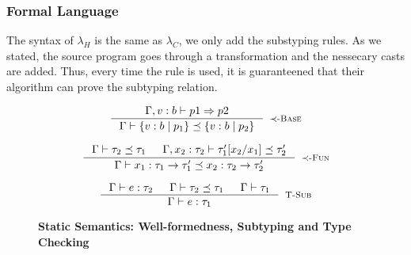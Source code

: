 \subsubsection{Formal Language}

The syntax of $\lambda_H$ is the same as $\lambda_C$, we only add the substyping rules.
As we stated, the source program goes through a transformation and the nessecary casts are added.
Thus, every time the \tsub rule is used, it is guaranteened that their algorithm can prove
the subtyping relation.

\begin{figure}[ht!]
\medskip {}

$$
\inference
   {\Gamma, v:b \vdash  p1 \Rightarrow p2 }
   {\isSubType{\Gamma}{\tref{b}{p_1}}{\tref{b}{p_2}}}
   [\tsubBase]
$$

$$
\inference
   {\isSubType{\Gamma}{\tau_2}{\tau_1} &
	\isSubType{\Gamma, x_2:{\tau_2}}{\SUBST{\tau_1'}{x_1}{x_2}}{\tau_2'}	
   }
   {\isSubType{\Gamma}
	  {\tfun{x_1}{\tau_1}{\tau_1'}}
	  {\tfun{x_2}{\tau_2}{\tau_2'}}
}[\tsubFun]
$$


\medskip {}

$$\begin{array}{cc}

\inference
  {  \hastype{\Gamma}{e}{\tau_2} && \isSubType{\Gamma}{\tau_2}{\tau_1} 
  && \isWellFormed{\Gamma}{\tau_1}
  }
  {\hastype{\Gamma}{e}{\tau_1}}
  [\tsub]
\end{array}$$

\caption{\textbf{Static Semantics: Well-formedness, Subtyping and Type Checking}}
\label{fig:rules}
\end{figure}

 